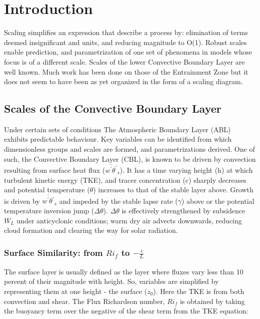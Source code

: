 
\chapter{Introduction} 
\label{ch:Introduction}
\setlength{\parindent}{0cm}
Scaling simplifies an expression that describe a process by: elimination of terms deemed insignificant and units, 
and reducing magnitude to O(1).  Robust scales enable prediction, and parametrization of one set of phenomena 
in models whose focus is of a different scale.  Scales of the lower Convective Boundary Layer are well known.  Much work has been done on those of the Entrainment Zone 
but it does not seem to have been as yet organized in the form of a scaling diagram.   



\section{Scales of the Convective Boundary Layer}
\label{sec:ScalesoftheConnvectiveBoundaryLayer}

Under certain sets of conditions The Atmospheric Boundary Layer (ABL) exhibits predictable behaviour.  
Key variables can be identified from which dimensionless groups and scales are formed, and parametrizations derived.  One of such, the Convective Boundary Layer (CBL), is known to be driven by convection resulting from 
surface heat flux ($\overline{w^{'}\theta^{'}}_{s}$).  It has a time varying height (h) at which turbulent
kinetic energy (TKE), and tracer concentration (c) sharply decreases and potential temperature ($\theta$)
increases to that of the stable layer above.  Growth is driven by $\overline{w^{'}\theta^{'}}_{s}$ and 
impeded by the stable lapse rate ($\gamma$) above  or the potential temperature inversion jump ($\Delta \theta$).  $\Delta \theta$ is effectively strengthened
by subsidence $W_{L}$ under anticyclonic conditions; warm dry air advects downwards, reducing cloud formation
and clearing the way for solar radiation.

\subsection{Surface Similarity: from $Ri_{f}$ to $-\frac{z}{L}$}
\label{subsec:MoninObukhovLength}
The surface layer is usually defined as the layer where fluxes vary less than 10 percent of their 
magnitude with height.  So, variables are simplified by representing them at one height - the surface ($z_{0}$).
Here the TKE is from both convection and shear.  The Flux Richardson number, $Ri_{f}$ is obtained by taking the buoyancy term over the negative of the shear 
term from the TKE equation:\\

